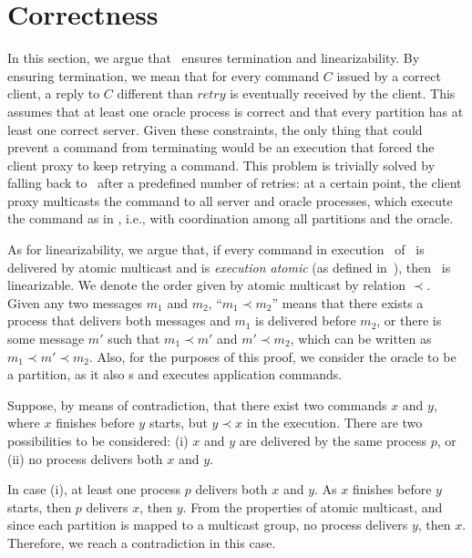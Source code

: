\section{Correctness}
\label{sec:dssmr-correctness}

In this section, we argue that \dssmr\ ensures termination and linearizability.
By ensuring termination, we mean that for every command $C$ issued by a correct
client, a reply to $C$ different than $retry$ is eventually received by the
client. This assumes that at least one oracle process is correct and that every
partition has at least one correct server. Given these constraints, the only
thing that could prevent a command from terminating would be an execution that
forced the client proxy to keep retrying a command. This problem is trivially
solved by falling back to \ssmr\ after a predefined number of retries: at a
certain point, the client proxy multicasts the command to all server and oracle
processes, which execute the command as in \ssmr{}, i.e., with coordination
among all partitions and the oracle.

As for linearizability, we argue that, if every command in execution \ex\ of
\dssmr\ is delivered by atomic multicast and is \emph{execution atomic} (as
defined in~\cite{bezerra2014ssmr}), then \ex\ is linearizable. We denote the
order given by atomic multicast by relation $\prec$. Given any two messages
$m_1$ and $m_2$, ``$m_1 \prec m_2$'' means that there exists a process that
delivers both messages and $m_1$ is delivered before $m_2$, or there is some
message $m'$ such that $m_1 \prec m'$ and $m' \prec m_2$, which can be written
as \mbox{$m_1 \prec m' \prec m_2$}.
Also, for the purposes of this proof, we consider the oracle to be a partition,
as it also \amdel{}s and executes application commands.

Suppose, by means of contradiction, that there exist two commands $x$ and $y$,
where $x$ finishes before $y$ starts, but $y \prec x$ in the execution. There
are two possibilities to be considered: (i) $x$ and $y$ are delivered by the
same process $p$, or (ii) no process delivers both $x$ and $y$.

In case (i), at least one process $p$ delivers both $x$ and $y$. As $x$ finishes
before $y$ starts, then $p$ delivers $x$, then $y$. From the properties of
atomic multicast, and since each partition is mapped to a multicast group, no
process delivers $y$, then $x$. Therefore, we reach a contradiction in this
case.

